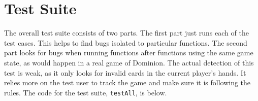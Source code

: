 \documentclass[letterpaper,12pt]{article}
\begin{document}
\section{Test Suite}
The overall test suite consists of two parts. The first part just runs each of
the test cases. This helps to find bugs isolated to particular functions. The
second part looks for bugs when running functions after functions using the
same game state, as would happen in a real game of Dominion. The actual
detection of this test is weak, as it only looks for invalid cards in the
current player's hands. It relies more on the test user to track the game and
make sure it is following the rules. The code for the test suite,
{\tt testAll}, is below.

\begin{scriptsize}

\end{scriptsize}
\end{document}
